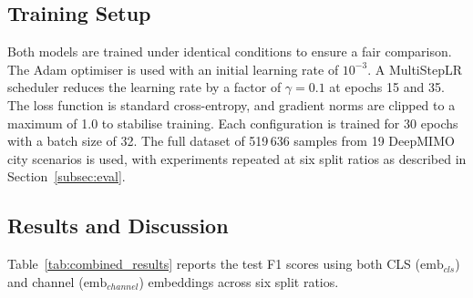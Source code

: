\documentclass[12pt,a4paper]{article}
\begin{document}
\subsection{Training Setup}

Both models are trained under identical conditions to ensure a fair comparison.  The Adam optimiser is used with an initial learning rate of $10^{-3}$.  A MultiStepLR scheduler reduces the learning rate by a factor of $\gamma=0.1$ at epochs 15 and 35.  The loss function is standard cross-entropy, and gradient norms are clipped to a maximum of 1.0 to stabilise training.  Each configuration is trained for 30 epochs with a batch size of 32.  The full dataset of 519\,636 samples from 19 DeepMIMO city scenarios is used, with experiments repeated at six split ratios as described in Section~\ref{subsec:eval}.

\subsection{Results and Discussion}\label{subsec:results}

Table~\ref{tab:combined_results} reports the test F1 scores using both CLS ($\mathrm{emb}_{cls}$) and channel ($\mathrm{emb}_{channel}$) embeddings across six split ratios.

\begin{table}[H]
\centering
\caption{Test F1 scores on beam prediction. $\Delta$ denotes the SECNN improvement in percentage points (pp).}
\label{tab:combined_results}
\end{table}
\end{document}
